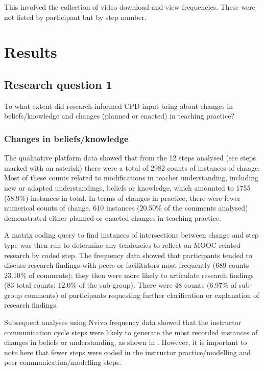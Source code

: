 \documentclass[output=paper]{langscibook}
\begin{document}
This involved the collection of video download and view frequencies. These were not listed by participant but by step number.

\section{Results}\label{sec:porter:3}
\subsection{Research question 1}\label{sec:porter:3.1}

To what extent did research-informed CPD input bring about changes in beliefs/knowledge and changes (planned or enacted) in teaching practice?

\subsubsection{Changes in beliefs/knowledge}\label{sec:porter:3.1.1}
\begin{sloppypar}
The qualitative platform data showed that from the 12 steps analysed (see  steps marked with an asterisk) there were a total of 2982 counts of instances of change. Most of these counts related to modifications in teacher understanding, including new or adapted understandings, beliefs or knowledge, which amounted to 1755 (58.9\%) instances in total. In terms of changes in practice, there were fewer numerical counts of change. 610 instances (20.50\% of the comments analysed) demonstrated either planned or enacted changes in teaching practice.
\end{sloppypar}

A matrix coding query to find instances of intersections between change and step type was then run to determine any tendencies to reflect on MOOC related research by coded step. The frequency data showed that participants tended to discuss research findings with peers or facilitators most frequently (689 counts -- 23.10\% of comments); they then were more likely to articulate research findings (83 total counts; 12.0\% of the sub-group). There were 48 counts (6.97\% of sub-group comments) of participants requesting further clarification or explanation of research findings. 

Subsequent analyses using Nvivo frequency data showed that the instructor communication cycle steps were likely to generate the most recorded instances of changes in beliefs or understanding, as shown in . However, it is important to note here that fewer steps were coded in the instructor practice/modelling and peer communication/modelling steps.
\end{document}
